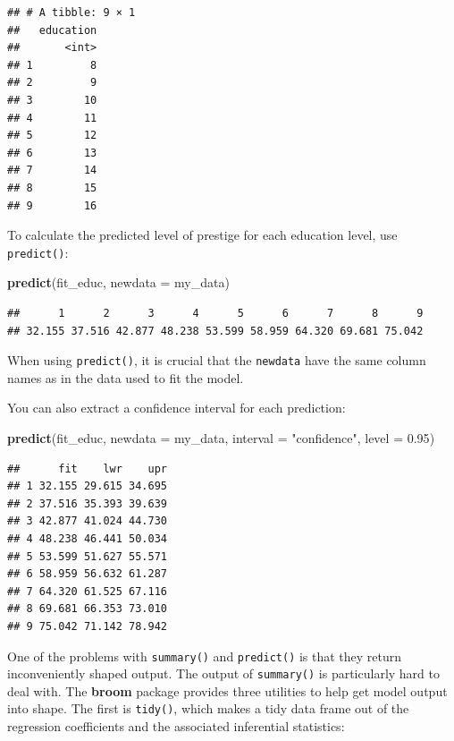 \documentclass[12pt,oneside,openany]{book}
\newenvironment{Shaded}{\begin{snugshade}}{\end{snugshade}}
\newcommand{\KeywordTok}[1]{\textcolor[rgb]{0.13,0.29,0.53}{\textbf{#1}}}
\newcommand{\DataTypeTok}[1]{\textcolor[rgb]{0.13,0.29,0.53}{#1}}
\newcommand{\FloatTok}[1]{\textcolor[rgb]{0.00,0.00,0.81}{#1}}
\newcommand{\StringTok}[1]{\textcolor[rgb]{0.31,0.60,0.02}{#1}}
\newcommand{\NormalTok}[1]{#1}
\begin{document}
\begin{verbatim}
## # A tibble: 9 × 1
##   education
##       <int>
## 1         8
## 2         9
## 3        10
## 4        11
## 5        12
## 6        13
## 7        14
## 8        15
## 9        16
\end{verbatim}

To calculate the predicted level of prestige for each education level,
use \texttt{predict()}:

\begin{Shaded}
\begin{Highlighting}[]
\KeywordTok{predict}\NormalTok{(fit_educ, }\DataTypeTok{newdata =}\NormalTok{ my_data)}
\end{Highlighting}
\end{Shaded}

\begin{verbatim}
##      1      2      3      4      5      6      7      8      9 
## 32.155 37.516 42.877 48.238 53.599 58.959 64.320 69.681 75.042
\end{verbatim}

When using \texttt{predict()}, it is crucial that the \texttt{newdata}
have the same column names as in the data used to fit the model.

You can also extract a confidence interval for each prediction:

\begin{Shaded}
\begin{Highlighting}[]
\KeywordTok{predict}\NormalTok{(fit_educ,}
        \DataTypeTok{newdata =}\NormalTok{ my_data,}
        \DataTypeTok{interval =} \StringTok{"confidence"}\NormalTok{,}
        \DataTypeTok{level =} \FloatTok{0.95}\NormalTok{)}
\end{Highlighting}
\end{Shaded}

\begin{verbatim}
##      fit    lwr    upr
## 1 32.155 29.615 34.695
## 2 37.516 35.393 39.639
## 3 42.877 41.024 44.730
## 4 48.238 46.441 50.034
## 5 53.599 51.627 55.571
## 6 58.959 56.632 61.287
## 7 64.320 61.525 67.116
## 8 69.681 66.353 73.010
## 9 75.042 71.142 78.942
\end{verbatim}

One of the problems with \texttt{summary()} and \texttt{predict()} is
that they return inconveniently shaped output. The output of
\texttt{summary()} is particularly hard to deal with. The \textbf{broom}
package provides three utilities to help get model output into shape.
The first is \texttt{tidy()}, which makes a tidy data frame out of the
regression coefficients and the associated inferential statistics:
\end{document}
